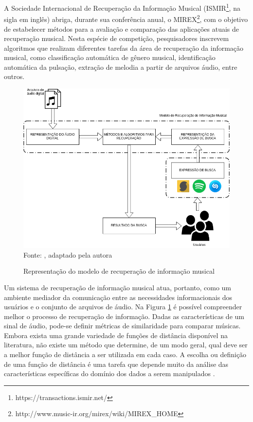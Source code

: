 A Sociedade Internacional de Recuperação da Informação Musical (ISMIR\footnote{https://transactions.ismir.net/}, na sigla em inglês) abriga, durante sua conferência anual, o MIREX\footnote{http://www.music-ir.org/mirex/wiki/MIREX\_HOME}, com o objetivo de estabelecer métodos para a avaliação e comparação das aplicações atuais de recuperação musical. Nesta espécie de competição, pesquisadores inscrevem algoritmos que realizam diferentes tarefas da área de recuperação da informação musical, como classificação automática de gênero musical, identificação automática da pulsação, extração de melodia a partir de arquivos áudio, entre outros.

\begin{figure}[!htb]
   \centering
   \caption{Representação do modelo de recuperação de informação musical} 
   \label{fig:modeloRecInfo} 
   \includegraphics[scale=0.47]{figuras/modeloRecInfo.png}
   \\Fonte: \cite{ferreira2015}, adaptado pela autora
\end{figure}

Um sistema de recuperação de informação musical atua, portanto, como um ambiente mediador da comunicação entre as necessidades informacionais dos usuários e o conjunto de arquivos de áudio. Na Figura \ref{fig:modeloRecInfo} é possível compreender melhor o processo de recuperação de informação. Dadas as características de um sinal de áudio, pode-se definir métricas de similaridade para comparar músicas. Embora exista uma grande variedade de funções de distância disponível na literatura, não existe um método que determine, de um modo geral, qual deve ser a melhor função de distância a ser utilizada em cada caso. A escolha ou definição de uma função de distância é uma tarefa que depende muito da análise das características específicas do domínio dos dados a serem manipulados \cite{barioni2006}.

